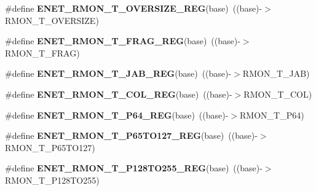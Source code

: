 \begin{DoxyCompactItemize}
\item 
\#define {\bfseries E\+N\+E\+T\+\_\+\+R\+M\+O\+N\+\_\+\+T\+\_\+\+O\+V\+E\+R\+S\+I\+Z\+E\+\_\+\+R\+EG}(base)~((base)-\/$>$R\+M\+O\+N\+\_\+\+T\+\_\+\+O\+V\+E\+R\+S\+I\+ZE)\hypertarget{group__ENET__Register__Accessor__Macros_gab3e72aa6c4f490664e6d23b5d7c5a2f6}{}\label{group__ENET__Register__Accessor__Macros_gab3e72aa6c4f490664e6d23b5d7c5a2f6}

\item 
\#define {\bfseries E\+N\+E\+T\+\_\+\+R\+M\+O\+N\+\_\+\+T\+\_\+\+F\+R\+A\+G\+\_\+\+R\+EG}(base)~((base)-\/$>$R\+M\+O\+N\+\_\+\+T\+\_\+\+F\+R\+AG)\hypertarget{group__ENET__Register__Accessor__Macros_gabb992bf7e3181b072bac550521847b7e}{}\label{group__ENET__Register__Accessor__Macros_gabb992bf7e3181b072bac550521847b7e}

\item 
\#define {\bfseries E\+N\+E\+T\+\_\+\+R\+M\+O\+N\+\_\+\+T\+\_\+\+J\+A\+B\+\_\+\+R\+EG}(base)~((base)-\/$>$R\+M\+O\+N\+\_\+\+T\+\_\+\+J\+AB)\hypertarget{group__ENET__Register__Accessor__Macros_gadaa7197b67f50c63f124fd9ebef16ae3}{}\label{group__ENET__Register__Accessor__Macros_gadaa7197b67f50c63f124fd9ebef16ae3}

\item 
\#define {\bfseries E\+N\+E\+T\+\_\+\+R\+M\+O\+N\+\_\+\+T\+\_\+\+C\+O\+L\+\_\+\+R\+EG}(base)~((base)-\/$>$R\+M\+O\+N\+\_\+\+T\+\_\+\+C\+OL)\hypertarget{group__ENET__Register__Accessor__Macros_ga09df12c321600bfd1f4668eef3e2ec38}{}\label{group__ENET__Register__Accessor__Macros_ga09df12c321600bfd1f4668eef3e2ec38}

\item 
\#define {\bfseries E\+N\+E\+T\+\_\+\+R\+M\+O\+N\+\_\+\+T\+\_\+\+P64\+\_\+\+R\+EG}(base)~((base)-\/$>$R\+M\+O\+N\+\_\+\+T\+\_\+\+P64)\hypertarget{group__ENET__Register__Accessor__Macros_gac6e972af8744e5005a436b92e016fcfd}{}\label{group__ENET__Register__Accessor__Macros_gac6e972af8744e5005a436b92e016fcfd}

\item 
\#define {\bfseries E\+N\+E\+T\+\_\+\+R\+M\+O\+N\+\_\+\+T\+\_\+\+P65\+T\+O127\+\_\+\+R\+EG}(base)~((base)-\/$>$R\+M\+O\+N\+\_\+\+T\+\_\+\+P65\+T\+O127)\hypertarget{group__ENET__Register__Accessor__Macros_ga64e4272ae765715d1815cb3f9222a846}{}\label{group__ENET__Register__Accessor__Macros_ga64e4272ae765715d1815cb3f9222a846}

\item 
\#define {\bfseries E\+N\+E\+T\+\_\+\+R\+M\+O\+N\+\_\+\+T\+\_\+\+P128\+T\+O255\+\_\+\+R\+EG}(base)~((base)-\/$>$R\+M\+O\+N\+\_\+\+T\+\_\+\+P128\+T\+O255)\hypertarget{group__ENET__Register__Accessor__Macros_gaaf4a671ca3150cb5b31f9100ad1f4652}{}\label{group__ENET__Register__Accessor__Macros_gaaf4a671ca3150cb5b31f9100ad1f4652}


\end{DoxyCompactItemize}
